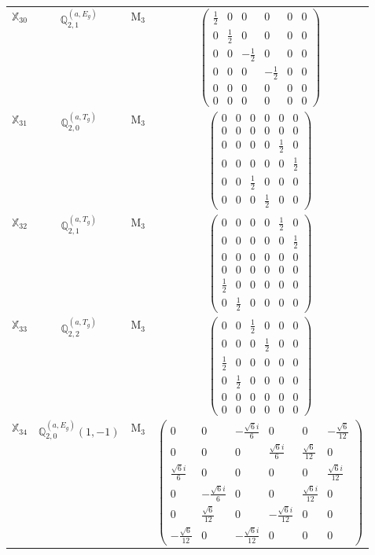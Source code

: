 \documentclass[fleqn,10pt,landscape]{article}
\begin{document}
\begin{itemize}
\begin{center}
\begin{longtable}{c|c|c|c}
$ \mathbb{X}_{30} $ & $\mathbb{Q}_{2,1}^{(a,E_{g})}$ & M$_{3}$ & $\begin{pmatrix} \frac{1}{2} & 0 & 0 & 0 & 0 & 0 \\ 0 & \frac{1}{2} & 0 & 0 & 0 & 0 \\ 0 & 0 & - \frac{1}{2} & 0 & 0 & 0 \\ 0 & 0 & 0 & - \frac{1}{2} & 0 & 0 \\ 0 & 0 & 0 & 0 & 0 & 0 \\ 0 & 0 & 0 & 0 & 0 & 0 \end{pmatrix}$ \\
$ \mathbb{X}_{31} $ & $\mathbb{Q}_{2,0}^{(a,T_{g})}$ & M$_{3}$ & $\begin{pmatrix} 0 & 0 & 0 & 0 & 0 & 0 \\ 0 & 0 & 0 & 0 & 0 & 0 \\ 0 & 0 & 0 & 0 & \frac{1}{2} & 0 \\ 0 & 0 & 0 & 0 & 0 & \frac{1}{2} \\ 0 & 0 & \frac{1}{2} & 0 & 0 & 0 \\ 0 & 0 & 0 & \frac{1}{2} & 0 & 0 \end{pmatrix}$ \\
$ \mathbb{X}_{32} $ & $\mathbb{Q}_{2,1}^{(a,T_{g})}$ & M$_{3}$ & $\begin{pmatrix} 0 & 0 & 0 & 0 & \frac{1}{2} & 0 \\ 0 & 0 & 0 & 0 & 0 & \frac{1}{2} \\ 0 & 0 & 0 & 0 & 0 & 0 \\ 0 & 0 & 0 & 0 & 0 & 0 \\ \frac{1}{2} & 0 & 0 & 0 & 0 & 0 \\ 0 & \frac{1}{2} & 0 & 0 & 0 & 0 \end{pmatrix}$ \\
$ \mathbb{X}_{33} $ & $\mathbb{Q}_{2,2}^{(a,T_{g})}$ & M$_{3}$ & $\begin{pmatrix} 0 & 0 & \frac{1}{2} & 0 & 0 & 0 \\ 0 & 0 & 0 & \frac{1}{2} & 0 & 0 \\ \frac{1}{2} & 0 & 0 & 0 & 0 & 0 \\ 0 & \frac{1}{2} & 0 & 0 & 0 & 0 \\ 0 & 0 & 0 & 0 & 0 & 0 \\ 0 & 0 & 0 & 0 & 0 & 0 \end{pmatrix}$ \\
$ \mathbb{X}_{34} $ & $\mathbb{Q}_{2,0}^{(a,E_{g})}(1,-1)$ & M$_{3}$ & $\begin{pmatrix} 0 & 0 & - \frac{\sqrt{6} i}{6} & 0 & 0 & - \frac{\sqrt{6}}{12} \\ 0 & 0 & 0 & \frac{\sqrt{6} i}{6} & \frac{\sqrt{6}}{12} & 0 \\ \frac{\sqrt{6} i}{6} & 0 & 0 & 0 & 0 & \frac{\sqrt{6} i}{12} \\ 0 & - \frac{\sqrt{6} i}{6} & 0 & 0 & \frac{\sqrt{6} i}{12} & 0 \\ 0 & \frac{\sqrt{6}}{12} & 0 & - \frac{\sqrt{6} i}{12} & 0 & 0 \\ - \frac{\sqrt{6}}{12} & 0 & - \frac{\sqrt{6} i}{12} & 0 & 0 & 0 \end{pmatrix}$ \\

\end{longtable}
\end{center}
\end{itemize}
\end{document}

